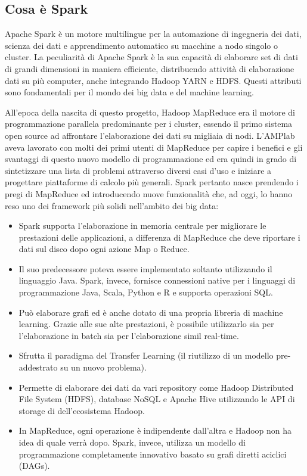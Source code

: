 \subsection{Cosa è Spark}
Apache Spark è un motore multilingue per la automazione di ingegneria dei dati, scienza dei dati e apprendimento automatico su macchine a nodo singolo o cluster. La peculiarità di Apache Spark è la sua capacità di elaborare set di dati di grandi dimensioni in maniera efficiente, distribuendo attività di elaborazione dati su più computer, anche integrando Hadoop YARN e HDFS. Questi attributi sono fondamentali per il mondo dei big data e del machine learning.

All'epoca della nascita di questo progetto, Hadoop MapReduce era il motore di programmazione parallela predominante per i cluster, essendo il primo sistema open source ad affrontare l'elaborazione dei dati su migliaia di nodi. L'AMPlab aveva lavorato con molti dei primi utenti di MapReduce per capire i benefici e gli svantaggi di questo nuovo modello di programmazione ed era quindi in grado di sintetizzare una lista di problemi attraverso diversi casi d'uso e iniziare a progettare piattaforme di calcolo più generali. Spark pertanto nasce prendendo i pregi di MapReduce ed introducendo nuove funzionalità che, ad oggi, lo hanno reso uno dei framework più solidi nell'ambito dei big data:
\begin{itemize}
    \item Spark supporta l’elaborazione in memoria centrale per migliorare le prestazioni delle applicazioni, a differenza di MapReduce che deve riportare i dati sul disco dopo ogni azione Map o Reduce.
    \item Il suo predecessore poteva essere implementato soltanto utilizzando il linguaggio Java. Spark, invece, fornisce connessioni native per i linguaggi di programmazione Java, Scala, Python e R e supporta operazioni SQL. 
    \item Può elaborare grafi ed è anche dotato di una propria libreria di machine learning. Grazie alle sue alte prestazioni, è possibile utilizzarlo sia per l'elaborazione in batch sia per l'elaborazione simil real-time. 
    \item Sfrutta il paradigma del Transfer Learning (il riutilizzo di un modello pre-addestrato su un nuovo problema). 
    \item Permette di elaborare dei dati da vari repository come Hadoop Distributed File System (HDFS), database NoSQL e Apache Hive utilizzando le API di storage di dell'ecosistema Hadoop.
    \item In MapReduce, ogni operazione è indipendente dall'altra e Hadoop non ha idea di quale verrà dopo. Spark, invece, utilizza un modello di programmazione completamente innovativo basato su grafi diretti aciclici (DAGs).
\end{itemize}
